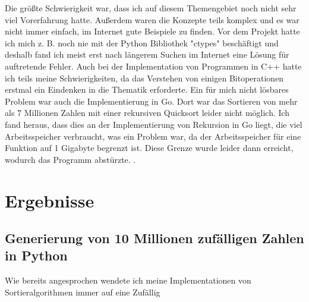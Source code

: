 \documentclass[10pt,a4paper]{article}
\begin{document}
Die größte Schwierigkeit war, dass ich auf diesem Themengebiet noch nicht sehr viel Vorerfahrung hatte.
Außerdem waren die Konzepte teils komplex und es war nicht immer einfach, im Internet gute Beispiele
zu finden. Vor dem Projekt hatte ich mich z. B. noch nie mit der Python Bibliothek "ctypes" beschäftigt
und deshalb fand ich meist erst nach längerem Suchen im Internet eine Lösung für auftretende Fehler.
Auch bei der Implementation von Programmen in C++ hatte ich teils meine Schwierigkeiten, da das Verstehen
von einigen Bitoperationen erstmal ein Eindenken in die Thematik erforderte.
Ein für mich nicht lösbares Problem war auch die Implementierung in Go.
Dort war das Sortieren von mehr als 7 Millionen Zahlen mit einer rekursiven Quicksort leider nicht möglich.
Ich fand heraus, dass dies an der Implementierung von Rekursion in Go liegt, die viel Arbeitsspeicher
verbraucht, was ein Problem war, da der Arbeitsspeicher für eine Funktion auf 1 Gigabyte begrenzt ist.
Diese Grenze wurde leider dann erreicht, wodurch das Programm abstürzte.
\cite{godeeprecursions} \cite{goroutinesize}.

\section{Ergebnisse}

\subsection{Generierung von 10 Millionen zufälligen Zahlen in Python}

\begin{bchart}[min=0, max=30, scale=2.1]
    \smallskip
    \smallskip
    \smallskip
    \smallskip
    \smallskip
\end{bchart}

Wie bereits angesprochen wendete ich meine Implementationen von Sortieralgorithmen immer
auf eine Zufällig
\end{document}
